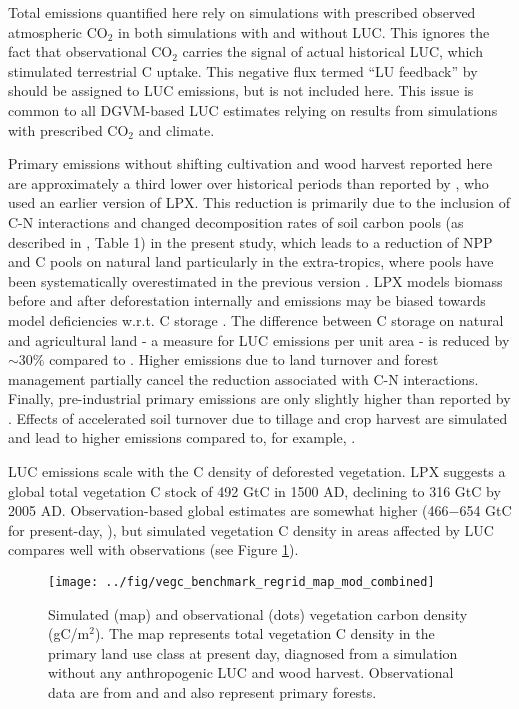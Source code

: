 Total emissions quantified here rely on simulations with prescribed observed atmospheric CO$_2$ in both simulations with and without LUC. This ignores the fact that observational CO$_2$ carries the signal of actual historical LUC, which stimulated terrestrial C uptake. This negative flux termed ``LU feedback'' by \citet{strassmann08tel} should be assigned to LUC emissions, but is not included here. This issue is common to all DGVM-based LUC estimates relying on results from simulations with prescribed CO$_2$ and climate.

Primary emissions without shifting cultivation and wood harvest reported here are approximately a third lower over historical periods than reported by \citet{stocker11bg}, who used an earlier version of LPX. This reduction is primarily due to the inclusion of C-N interactions and changed decomposition rates of soil carbon pools (as described in \citet{spahni12cpd}, Table 1) in the present study, which leads to a reduction of NPP and C pools on natural land particularly in the extra-tropics, where pools have been systematically overestimated in the previous version \citep{stocker11bg}. LPX models biomass before and after deforestation internally and emissions may be biased towards model deficiencies w.r.t. C storage \citep{stocker11bg}. The difference between C storage on natural and agricultural land - a measure for LUC emissions per unit area - is reduced by $\sim$30\% compared to \citet{stocker11bg}. Higher emissions due to land turnover and forest management partially cancel the reduction associated with C-N interactions. Finally, pre-industrial primary emissions are only slightly higher than reported by \citet{stocker11bg}. Effects of accelerated soil turnover due to tillage and crop harvest are simulated and lead to higher emissions compared to, for example, \citet{pongratz09}.

LUC emissions scale with the C density of deforested vegetation. LPX suggests a global total vegetation C stock of 492 GtC in 1500 AD, declining to 316 GtC by 2005 AD. Observation-based global estimates are somewhat higher (466$-$654 GtC for present-day, \citet{prentice01ipcc}), but simulated vegetation C density in areas affected by LUC compares well with observations (see Figure \ref{fig:vegc}).
\begin{figure}
\begin{center}
 \noindent
 \texttt{[image: ../fig/vegc\_benchmark\_regrid\_map\_mod\_combined]}
 \caption[Simulated and observational vegetation carbon density]{Simulated (map) and observational (dots) vegetation carbon density (gC/m$^2$). The map represents total vegetation C density in the primary land use class at present day, diagnosed from a simulation without any anthropogenic LUC and wood harvest. Observational data are from \citet{luyssaert07gcb} and \citet{keith09pnas} and also represent primary forests.}
 \label{fig:vegc}
\end{center}
\end{figure}

